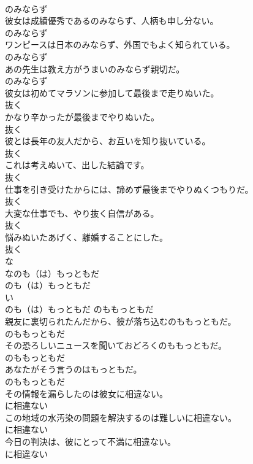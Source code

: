 \documentclass[8pt]{extreport}
\begin{document}
\begin{CJK}{UTF8}{min}
\\	のみならず
\\	彼女は成績優秀であるのみならず、人柄も申し分ない。	
\\	のみならず
\\	ワンピースは日本のみならず、外国でもよく知られている。	
\\	のみならず
\\	あの先生は教え方がうまいのみならず親切だ。	
\\	のみならず
\\	彼女は初めてマラソンに参加して最後まで走りぬいた。	
\\	抜く
\\	かなり辛かったが最後までやりぬいた。	
\\	抜く
\\	彼とは長年の友人だから、お互いを知り抜いている。	
\\	抜く
\\	これは考えぬいて、出した結論です。	
\\	抜く
\\	仕事を引き受けたからには、諦めず最後までやりぬくつもりだ。	
\\	抜く
\\	大変な仕事でも、やり抜く自信がある。	
\\	抜く
\\	悩みぬいたあげく、離婚することにした。	
\\	抜く
\\	な
\\	なのも（は）もっともだ	
\\	のも（は）もっともだ	
\\	い
\\	のも（は）もっともだ	のももっともだ
\\	親友に裏切られたんだから、彼が落ち込むのももっともだ。	
\\	のももっともだ
\\	その恐ろしいニュースを聞いておどろくのももっともだ。	
\\	のももっともだ
\\	あなたがそう言うのはもっともだ。	
\\	のももっともだ
\\	その情報を漏らしたのは彼女に相違ない。	
\\	に相違ない
\\	この地域の水汚染の問題を解決するのは難しいに相違ない。	
\\	に相違ない
\\	今日の判決は、彼にとって不満に相違ない。	
\\	に相違ない

\end{CJK}
\end{document}
